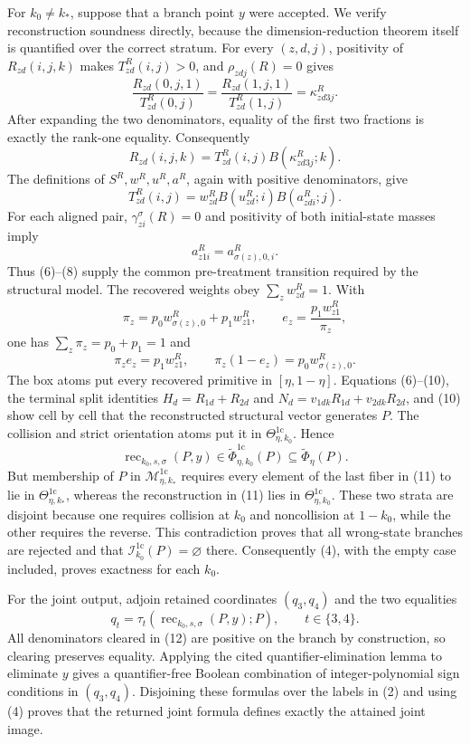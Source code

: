 For \(k_0\neq k_\ast\), suppose that a branch point \(y\) were accepted.
We verify reconstruction soundness directly, because the
dimension-reduction theorem itself is quantified over the correct stratum.
For every \((z,d,j)\), positivity of \(R_{zd}(i,j,k)\) makes
\(T_{zd}^R(i,j)>0\), and \(\rho_{zdj}(R)=0\) gives
\[
\frac{R_{zd}(0,j,1)}{T_{zd}^R(0,j)}
=\frac{R_{zd}(1,j,1)}{T_{zd}^R(1,j)}
=\kappa_{zd3j}^R.
\tag{5}
\]
After expanding the two denominators, equality of the first two fractions is
exactly the rank-one equality.  Consequently
\[
R_{zd}(i,j,k)=T_{zd}^R(i,j)B(\kappa_{zd3j}^R;k).
\tag{6}
\]
The definitions of \(S^R,w^R,u^R,a^R\), again with positive denominators,
give
\[
T_{zd}^R(i,j)
=w_{zd}^R B(u_{zd}^R;i)B(a_{zdi}^R;j).
\tag{7}
\]
For each aligned pair, \(\gamma_{zi}^{\sigma}(R)=0\) and positivity of both
initial-state masses imply
\[
a_{z1i}^R=a_{\sigma(z),0,i}^R.
\tag{8}
\]
Thus (6)--(8) supply the common pre-treatment transition required by the
structural model.  The recovered weights obey \(\sum_z w_{zd}^R=1\).  With
\[
\pi_z=p_0w_{\sigma(z),0}^R+p_1w_{z1}^R,
\qquad
e_z=\frac{p_1w_{z1}^R}{\pi_z},
\tag{9}
\]
one has \(\sum_z\pi_z=p_0+p_1=1\) and
\[
\pi_ze_z=p_1w_{z1}^R,
\qquad
\pi_z(1-e_z)=p_0w_{\sigma(z),0}^R.
\tag{10}
\]
The box atoms put every recovered primitive in \([\eta,1-\eta]\).
Equations (6)--(10), the terminal split identities
\(H_d=R_{1d}+R_{2d}\) and
\(N_d=v_{1dk}R_{1d}+v_{2dk}R_{2d}\), and (10) show cell by cell that the
reconstructed structural vector generates \(P\).  The collision and strict
orientation atoms put it in \(\Theta_{\eta,k_0}^{1\mathrm c}\).  Hence
\[
\operatorname{rec}_{k_0,s,\sigma}(P,y)
 \in\widetilde\Phi_{\eta,k_0}^{1\mathrm c}(P)
 \subseteq\widetilde\Phi_\eta(P).
\tag{11}
\]
But membership of \(P\) in
\(\mathcal M_{\eta,k_\ast}^{1\mathrm c}\) requires every element of the last
fiber in (11) to lie in \(\Theta_{\eta,k_\ast}^{1\mathrm c}\), whereas the
reconstruction in (11) lies in \(\Theta_{\eta,k_0}^{1\mathrm c}\).  These two
strata are disjoint because one requires collision at \(k_0\) and
noncollision at \(1-k_0\), while the other requires the reverse.  This
contradiction proves that all wrong-state branches are rejected and that
\(\mathcal I_{k_0}^{1\mathrm c}(P)=\varnothing\) there.  Consequently (4),
with the empty case included, proves exactness for each \(k_0\).

For the joint output, adjoin retained coordinates \((q_3,q_4)\) and the two
equalities
\[
q_t=\tau_t\!\left(
 \operatorname{rec}_{k_0,s,\sigma}(P,y);P\right),
\qquad t\in\{3,4\}.
\tag{12}
\]
All denominators cleared in (12) are positive on the branch by construction,
so clearing preserves equality.  Applying the cited quantifier-elimination
lemma to eliminate \(y\) gives a quantifier-free Boolean combination of
integer-polynomial sign conditions in \((q_3,q_4)\).  Disjoining these
formulas over the labels in (2) and using (4) proves that the returned joint
formula defines exactly the attained joint image.

